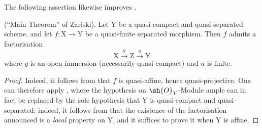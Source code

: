 The following assertion likewise improves .

\begin{corollary}[18.12.13]
\label{IV.18.12.13}
(``Main Theorem'' of Zariski).
Let $\mathrm{Y}$ be a quasi-compact and quasi-separated scheme, and let $f:\mathrm{X}\to\mathrm{Y}$ be a quasi-finite separated morphism.
Then $f$ admits a factorisation
\[
  \mathrm{X}\xrightarrow{g}\mathrm{Z}\xrightarrow{u}\mathrm{Y}
\]
where $g$ is an open immersion (necessarily quasi-compact) and $u$ is finite.
\end{corollary}

\begin{proof}
Indeed, it follows from  that $f$ is quasi-affine, hence quasi-projective.
One can therefore apply , where the hypothesis on $\sh{O}_Y$-Module ample can in fact be replaced by the sole hypothesis that $\mathrm{Y}$ is quasi-compact and quasi-separated: indeed, it follows from  that the existence of the factorisation announced is a \emph{local} property on $\mathrm{Y}$, and it suffices to prove it when $\mathrm{Y}$ is affine.
\end{proof}

